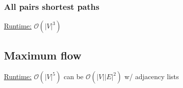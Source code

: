 \subsubsection{All pairs shortest paths}
\underline{Runtime:} $\mathcal{O}(\lvert V \rvert^3)$


\subsection{Maximum flow}

\underline{Runtime:} $\mathcal{O}(\lvert V \rvert^5)$ can be
$\mathcal{O}(\lvert V \rvert \lvert E \rvert^2)$ w/ adjacency lists


